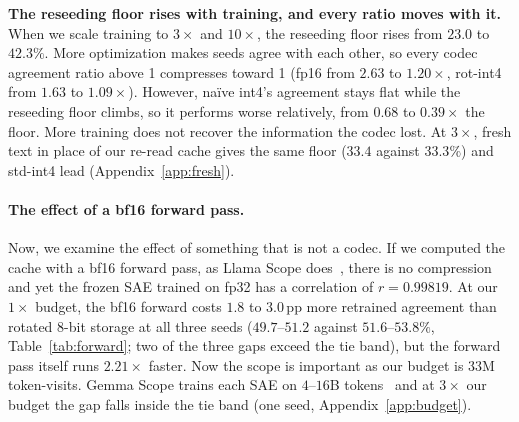 \documentclass{article}
\begin{document}
\textbf{The reseeding floor rises with training, and every ratio moves
with it.} When we scale training to
$3\times$ and $10\times$, the reseeding floor rises from $23.0$ to
$42.3\%$. More optimization makes seeds agree with each other, so every
codec agreement ratio above 1 compresses toward 1 (fp16 from $2.63$ to
$1.20\times$, rot-int4 from $1.63$ to $1.09\times$). However, na\"ive
int4's agreement stays flat while the reseeding floor climbs, so it
performs worse relatively, from $0.68$ to $0.39\times$ the floor. More
training does not recover the information the codec lost. At
$3\times$, fresh text in place of our re-read cache gives the same
floor ($33.4$ against $33.3\%$) and std-int4 lead
(Appendix~\ref{app:fresh}).

\paragraph{The effect of a bf16 forward pass.} Now, we examine the
effect of something that is not a codec. If we computed the cache with
a bf16 forward pass, as Llama Scope does~\citep{llamascope},
there is no compression and yet the
frozen SAE trained on fp32 has a correlation of $r = 0.99819$. At our
$1\times$ budget, the bf16 forward costs $1.8$ to $3.0$\,pp more
retrained agreement than rotated 8-bit storage at all three seeds
($49.7$--$51.2$ against $51.6$--$53.8\%$, Table~\ref{tab:forward}; two
of the three gaps exceed the tie band), but the forward pass itself
runs $2.21\times$ faster. Now the scope is important as our budget is
33M token-visits. Gemma Scope trains each SAE on $4$--$16$B
tokens~\citep{gemmascope} and at $3\times$ our budget the gap falls
inside the tie band (one seed, Appendix~\ref{app:budget}).
\end{document}
